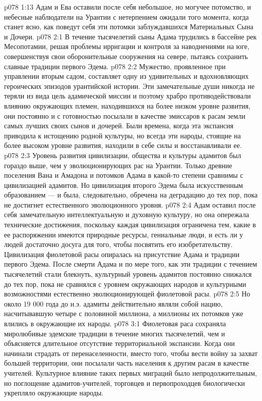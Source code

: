 \vs p078 1:13 Адам и Ева оставили после себя небольшое, но могучее потомство, и небесные наблюдатели на Урантии с нетерпением ожидали того момента, когда станет ясно, как поведут себя эти потомки заблуждавшихся Материальных Сына и Дочери.
\vs p078 2:1 В течение тысячелетий сыны Адама трудились в бассейне рек Месопотамии, решая проблемы ирригации и контроля за наводнениями на юге, совершенствуя свои оборонительные сооружения на севере, пытаясь сохранить славные традиции первого Эдема.
\vs p078 2:2 Мужество, проявленное при управлении вторым садом, составляет одну из удивительных и вдохновляющих героических эпизодов урантийской истории. Эти замечательные души никогда не теряли из вида цель адамической миссии и поэтому храбро противодействовали влиянию окружающих племен, находившихся на более низком уровне развития, они постоянно и с готовностью посылали в качестве эмиссаров к расам земли самых лучших своих сынов и дочерей. Были времена, когда эта экспансия приводила к истощению родной культуры, но всегда эти народы, стоящие на более высоком уровне развития, находили в себе силы и восстанавливали ее.
\vs p078 2:3 Уровень развития цивилизации, общества и культуры адамитов был гораздо выше, чем у эволюционирующих рас на Урантии. Только древние поселения Вана и Амадона и потомков Адама в какой\hyp{}то степени сравнимы с цивилизацией адамитов. Но цивилизация второго Эдема была искусственным образованием ---  и была, следовательно, обречена на деградацию до тех пор, пока не достигнет естественного эволюционного уровня.
\vs p078 2:4 Адам оставил после себя замечательную интеллектуальную и духовную культуру, но она опережала технические достижения, поскольку каждая цивилизация ограничена тем, какие в ее распоряжении имеются природные ресурсы, гениальные люди, и есть ли у людей достаточно досуга для того, чтобы посвятить его изобретательству. Цивилизация фиолетовой расы опиралась на присутствие Адама и традиции первого Эдема. После смерти Адама и по мере того, как эти традиции с течением тысячелетий стали блекнуть, культурный уровень адамитов постоянно снижался до тех пор, пока не сравнялся с уровнем окружающих народов и культурными возможностями естественно эволюционирующей фиолетовой расы.
\vs p078 2:5 Но около 19 000 года до н.э. адамиты действительно являли собой нацию, насчитывавшую четыре с половиной миллиона, а миллионы их потомков уже влились в окружающие их народы.
\vs p078 3:1 Фиолетовая раса сохраняла миролюбивые эдемские традиции в течение многих тысячелетий, чем и объясняется длительное отсутствие территориальной экспансии. Когда они начинали страдать от перенаселенности, вместо того, чтобы вести войну за захват большей территории, они посылали часть населения к другим расам в качестве учителей. Культурное влияние таких первых миграций было непродолжительным, но поглощение адамитов\hyp{}учителей, торговцев и первопроходцев биологически укрепляло окружающие народы.
